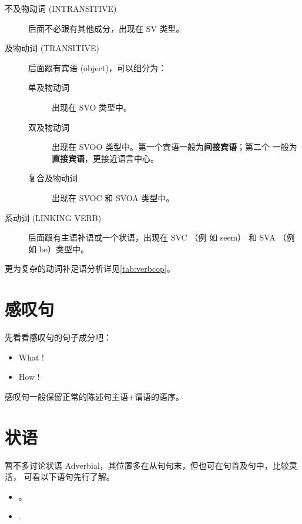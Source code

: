 \begin{description}
\item [不及物动词 (INTRANSITIVE)] 后面不必跟有其他成分，出现在 SV 类型。

\item [及物动词 (TRANSITIVE)] 后面跟有宾语 (object)，可以细分为：
  \begin{description}
  \item[单及物动词] 出现在 SVO 类型中。
  \item[双及物动词] 出现在 SVOO 类型中。第一个宾语一般为\textbf{间接宾语}；第二个
    一般为\textbf{直接宾语}，更接近语言中心。

  \item[复合及物动词] 出现在 SVOC 和 SVOA 类型中。
  \end{description}

\item[系动词 (LINKING VERB)] 后面跟有主语补语或一个状语，出现在 SVC （例
  如 seem） 和 SVA （例如 be）类型中。
\end{description}

更为复杂的动词补足语分析详见\cref{tab:verbcop}。

\section{感叹句}

先看看感叹句的句子成分吧：
\begin{itemize}
\item What   !
\item How    !
\end{itemize}

感叹句一般保留正常的陈述句主语+谓语的语序。



\section{状语}

暂不多讨论状语 Adverbial，其位置多在从句句末，但也可在句首及句中，比较灵活，
可看以下语句先行了解。

\begin{itemize}
\item {}   
  。
\item {}    .
\end{itemize}


